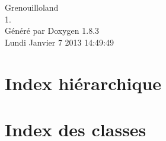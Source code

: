 \documentclass{book}
\begin{document}
\hypersetup{pageanchor=false,citecolor=blue}
\begin{titlepage}
\vspace*{7cm}
\begin{center}
{\Large Grenouilloland \\[1ex]\large 1. }\\
\vspace*{1cm}
{\large Généré par Doxygen 1.8.3}\\
\vspace*{0.5cm}
{\small Lundi Janvier 7 2013 14:49:49}\\
\end{center}
\end{titlepage}
\clearemptydoublepage
{}
\tableofcontents
\clearemptydoublepage
{}
\hypersetup{pageanchor=true,citecolor=blue}
\chapter{Index hiérarchique}

\chapter{Index des classes}

\end{document}
